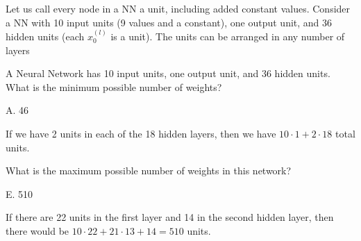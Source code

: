\documentclass[answers]{exam}
\begin{document}
Let us call every node in a NN a unit, including added constant values. Consider
a NN with 10 input units (9 values and a constant), one output unit, and 36
hidden units (each $x_0^{(l)}$ is a unit). The units can be arranged in any 
number of layers

\begin{questions}
\setcounter{question}{8}
\question A Neural Network has 10 input units, one output unit, and 36 hidden 
units. What is the minimum possible number of weights?
\begin{choices}
\end{choices}

\begin{solution}
A. 46

If we have 2 units in each of the 18 hidden layers, then we have $10 \cdot 1 + 2 \cdot 18$
total units.
\end{solution}

\question What is the maximum possible number of weights in this network?
\begin{choices}
\end{choices}

\begin{solution}
E. 510

If there are 22 units in the first layer and 14 in the second hidden layer, 
then there would be $10 \cdot 22 + 21 \cdot 13 + 14 = 510$ units.
\end{solution}
\end{questions}
\end{document}
